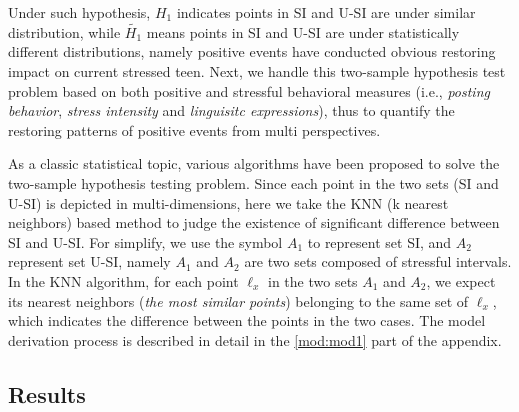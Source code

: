 Under such hypothesis,
$H_1$ indicates points in SI and U-SI are under similar distribution,
while $\widetilde{H_1}$ means points in SI and U-SI are under statistically different distributions,
namely positive events have conducted obvious restoring impact on current stressed teen.
Next, we handle this two-sample hypothesis test problem based on both positive and stressful behavioral measures
(i.e., \emph{posting behavior}, \emph{stress intensity} and \emph{linguisitc expressions}),
thus to quantify the restoring patterns of positive events from multi perspectives.

As a classic statistical topic, various algorithms have been proposed to solve the two-sample hypothesis testing problem.
Since each point in the two sets (SI and U-SI) is depicted in multi-dimensions,
here we take the KNN (k nearest neighbors) \cite{Schilling1986Multivariate}
based method to judge the existence of significant difference between SI and U-SI.
For simplify, we use the symbol $A_1$ to represent set SI,
and $A_2$ represent set U-SI,
namely $A_1$ and $A_2$ are two sets composed of stressful intervals.
In the KNN algorithm,
for each point $\ell_{x}$ in the two sets $A_1$ and $A_2$,
we expect its nearest neighbors (\emph{the most similar points}) belonging to the same set of $\ell_x$,
which indicates the difference between the points in the two cases.
The model derivation process is described in detail in the \ref{mod:mod1} part of the appendix.

\subsection{Results}
\begin{table}[H]
\begin{center}
\caption{\small{Quantify the impact of scheduled positive school events using KTS and baseline method ($^1$KTS denotes the knn-based two sample method adopted in this research.).}}
\label{tab:schedule}
\end{center}
\end{table}

